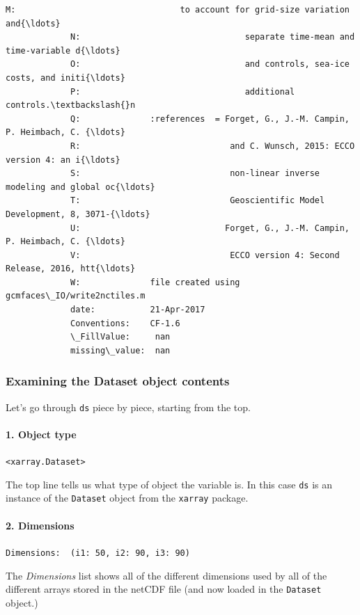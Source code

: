 \documentclass[11pt]{article}
\begin{document}
\begin{Verbatim}[commandchars=\\\{\}]
             M:                                 to account for grid-size variation and{\ldots}
             N:                                 separate time-mean and time-variable d{\ldots}
             O:                                 and controls, sea-ice costs, and initi{\ldots}
             P:                                 additional controls.\textbackslash{}n 
             Q:              :references  = Forget, G., J.-M. Campin, P. Heimbach, C. {\ldots}
             R:                              and C. Wunsch, 2015: ECCO version 4: an i{\ldots}
             S:                              non-linear inverse modeling and global oc{\ldots}
             T:                              Geoscientific Model Development, 8, 3071-{\ldots}
             U:                             Forget, G., J.-M. Campin, P. Heimbach, C. {\ldots}
             V:                              ECCO version 4: Second Release, 2016, htt{\ldots}
             W:              file created using gcmfaces\_IO/write2nctiles.m
             date:           21-Apr-2017
             Conventions:    CF-1.6
             \_FillValue:     nan
             missing\_value:  nan
\end{Verbatim}
            
    \subsubsection{Examining the Dataset object
contents}\label{examining-the-dataset-object-contents}

Let's go through \texttt{ds} piece by piece, starting from the top.

\paragraph{1. Object type}\label{object-type}

\texttt{\textless{}xarray.Dataset\textgreater{}}

The top line tells us what type of object the variable is. In this case
\texttt{ds} is an instance of the \texttt{Dataset} object from the
\texttt{xarray} package.

\paragraph{2. Dimensions}\label{dimensions}

\texttt{Dimensions:\ \ (i1:\ 50,\ i2:\ 90,\ i3:\ 90)}

The \emph{Dimensions} list shows all of the different dimensions used by
all of the different arrays stored in the netCDF file (and now loaded in
the \texttt{Dataset} object.)
\end{document}
